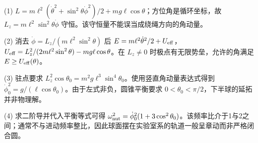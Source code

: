 (1) \(L=m\ell^2(\dot\theta^2+\sin^2\theta\dot\phi^2)/2+mg\ell\cos\theta\)；方位角是循环坐标，故 \(L_z=m\ell^2\sin^2\theta\dot\phi\) 守恒。该守恒量不能误当成绕绳方向的角动量。

(2) 消去 \(\dot\phi=L_z/(m\ell^2\sin^2\theta)\) 后 \(E=m\ell^2\dot\theta^2/2+U_{\rm eff}\)，\(U_{\rm eff}=L_z^2/(2m\ell^2\sin^2\theta)-mg\ell\cos\theta\)。在 \(L_z\ne0\) 时极点有无限势垒，允许的角满足 \(E\ge U_{\rm eff}(\theta)\)。

(3) 驻点要求 \(L_z^2\cos\theta_0=m^2g\ell^3\sin^4\theta_0\)。使用竖直角动量表达式得到 \(\dot\phi_0^2=g/(\ell\cos\theta_0)\)。由于左式非负，圆锥平衡要求 \(0<\theta_0<\pi/2\)，下半球的延拓并非物理解。

(4) 求二阶导并代入平衡等式可得 \(\omega_{\rm nut}^2=\dot\phi_0^2(1+3\cos^2\theta_0)\)。该频率比介于1与2之间；通常不与进动频率整比，因此球面摆在实验室系的轨道一般呈章动而非严格闭合圆。
